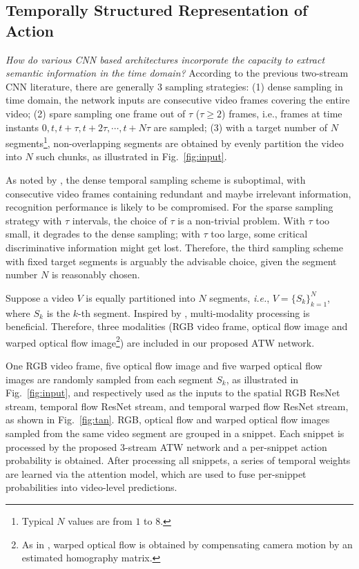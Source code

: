 \documentclass[runningheads,a4paper]{llncs}
\begin{document}
\subsection{Temporally Structured Representation of Action}\label{sample}
%
{\em How do various CNN based architectures incorporate the capacity to extract semantic information in the time domain?} According to the previous two-stream CNN \cite{simonyan2014two} literature, there are generally $3$ sampling strategies: (1) dense sampling in time domain, the network inputs are consecutive video frames covering the entire video; (2) spare sampling one frame out of $\tau$ ($\tau \geq 2$) frames, i.e., frames at time instants $0,t,t+\tau,t+2\tau,\cdots,t+N\tau$ are sampled; (3) with a target number of $N$ segments\footnote{Typical $N$ values are from $1$ to $8$.}, non-overlapping segments are obtained by evenly partition the video into $N$ such chunks, as illustrated in Fig.~\ref{fig:input}.

As noted by \cite{feichtenhofer2016convolutional,donahue2015long,wang2016temporal}, the dense temporal sampling scheme is suboptimal, with consecutive video frames containing redundant and maybe irrelevant information, recognition performance is likely to be compromised.  For the sparse sampling strategy with $\tau$ intervals, the choice of $\tau$ is a non-trivial problem. With $\tau$ too small, it degrades to the dense sampling; with $\tau$ too large, some critical discriminative information might get lost. Therefore, the third sampling scheme with fixed target segments is arguably the advisable choice, given the segment number $N$ is reasonably chosen.


Suppose a video $V$ is equally partitioned into $N$ segments, {\em i.e.}, $V = \{S_k\}^N_{k=1}$, where $S_k$ is the $k$-th segment. Inspired by \cite{simonyan2014two,wang2016temporal,zhang2011fast}, multi-modality processing is beneficial. Therefore, three modalities (RGB video frame, optical flow image and warped optical flow image\footnote{As in \cite{ wang2013action}, warped optical flow is obtained by compensating camera motion by an estimated homography matrix.}) are included in our proposed ATW network.
%


One RGB video frame, five optical flow image and five warped optical flow images are randomly sampled from each segment $S_k$, as illustrated in Fig.~\ref{fig:input}, and respectively used as the inputs to the spatial RGB ResNet stream, temporal flow ResNet stream, and temporal warped flow ResNet stream, as shown in Fig.~\ref{fig:tan}. RGB, optical flow and warped optical flow images sampled from the same video segment are grouped in a snippet. Each snippet is processed by the proposed $3$-stream ATW network and a per-snippet action probability is obtained. After processing all snippets, a series of temporal weights are learned via the attention model, which are used to fuse per-snippet probabilities into video-level predictions.
\end{document}
